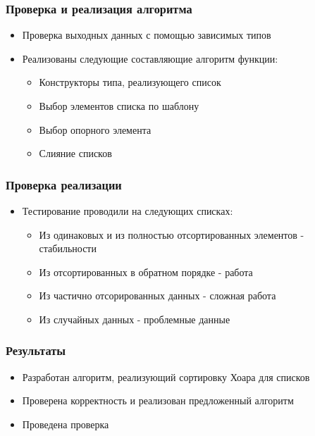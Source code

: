 \documentclass{beamer}
\begin{document}
\begin{frame}
  \transwipe[direction=90]
  \frametitle{Проверка и реализация алгоритма}
  \begin{itemize}
    \item Проверка выходных данных с помощью зависимых типов
    \item Реализованы следующие составляющие алгоритм функции:
    \begin{itemize}
      \item Конструкторы типа, реализующего список
      \item Выбор элементов списка по шаблону
      \item Выбор опорного элемента
      \item Слияние списков
    \end{itemize} 
  \end{itemize}
\end{frame}

\begin{frame}
  \transwipe[direction=90]
  \frametitle{Проверка реализации}
  \begin{itemize}
    \item Тестирование проводили на следующих списках:
    \begin{itemize}
      \item Из одинаковых и из полностью отсортированных элементов - стабильности
      \item Из отсортированных в обратном порядке - работа
      \item Из частично отсорированных данных - сложная работа
      \item Из случайных данных - проблемные данные
    \end{itemize}             
  \end{itemize}
\end{frame}
                                                           
\begin{frame}
  \transwipe[direction=90]
  \frametitle{Результаты}
  \begin{itemize}
    \item Разработан алгоритм, реализующий сортировку Хоара для списков
    \item Проверена корректность и реализован предложенный алгоритм
    \item Проведена проверка
  \end{itemize}
\end{frame}
\end{document}
